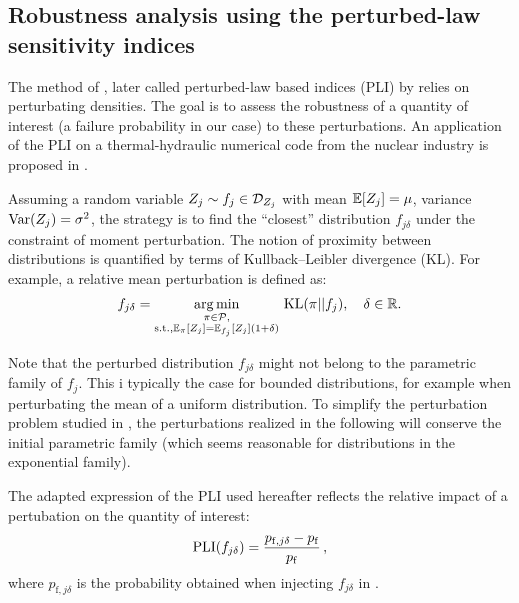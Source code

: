 \subsection{Robustness analysis using the perturbed-law sensitivity indices}\label{sec:owt_robustness}
The method of \citet{lemaitre_2015_PLI}, later called perturbed-law based indices (PLI) by \citet{sueur_2017_PLI} relies on perturbating densities. 
The goal is to assess the robustness of a quantity of interest (a failure probability in our case) to these perturbations. 
An application of the PLI on a thermal-hydraulic numerical code from the nuclear industry is proposed in \citet{iooss_2022_pli}. 


Assuming a random variable $Z_j \sim f_j \in \mathcal{D}_{Z_j}$ with mean $\mathbb{E}[Z_j]=\mu$, variance $\operatorname{Var}(Z_j) = \sigma^2$, the strategy is to find the ``closest'' distribution $f_{j \delta}$ under the constraint of moment perturbation.  
The notion of proximity between distributions is quantified by \citet{lemaitre_2015_PLI} terms of Kullback–Leibler divergence (KL). 
For example, a relative mean perturbation is defined as: 
\begin{eqnarray}
    f_{j \delta} = \operatorname*{arg\,min}_{\substack{\pi\in \mathcal{P}, \\ \mathrm{s.t.}, \mathbb{E}_\pi[Z_j] = \mathbb{E}_{f_j}[Z_j](1 + \delta)}} \, \mathrm{KL}(\pi||f_j), \quad \delta \in \mathbb{R}. 
\end{eqnarray} 

Note that the perturbed distribution $f_{j \delta}$ might not belong to the parametric family of $f_j$. 
This i typically the case for bounded distributions, for example when perturbating the mean of a uniform distribution.  
To simplify the perturbation problem studied in \citet{lemaitre_2015_PLI, gauchy_2022_PLI}, the perturbations realized in the following will conserve the initial parametric family (which seems reasonable for distributions in the exponential family). 

The adapted expression of the PLI used hereafter \citep{gauchy_2022_PLI} reflects the relative impact of a pertubation on the quantity of interest: 
\begin{equation}
    \mathrm{PLI}(f_{j \delta}) = \frac{p_{\mathrm{f}, j \delta} - p_\mathrm{f} }{p_\mathrm{f}} \,,
\end{equation}
where $p_{\mathrm{f}, j \delta}$ is the probability obtained when injecting $f_{j \delta}$ in .

